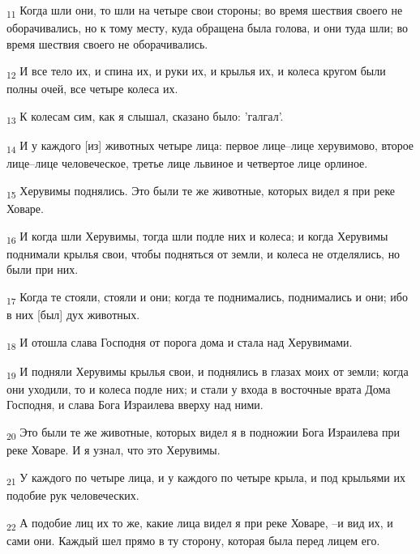 \begin{tcolorbox}
\textsubscript{11} Когда шли они, то шли на четыре свои стороны; во время шествия своего не оборачивались, но к тому месту, куда обращена была голова, и они туда шли; во время шествия своего не оборачивались.
\end{tcolorbox}
\begin{tcolorbox}
\textsubscript{12} И все тело их, и спина их, и руки их, и крылья их, и колеса кругом были полны очей, все четыре колеса их.
\end{tcolorbox}
\begin{tcolorbox}
\textsubscript{13} К колесам сим, как я слышал, сказано было: 'галгал'.
\end{tcolorbox}
\begin{tcolorbox}
\textsubscript{14} И у каждого [из] животных четыре лица: первое лице--лице херувимово, второе лице--лице человеческое, третье лице львиное и четвертое лице орлиное.
\end{tcolorbox}
\begin{tcolorbox}
\textsubscript{15} Херувимы поднялись. Это были те же животные, которых видел я при реке Ховаре.
\end{tcolorbox}
\begin{tcolorbox}
\textsubscript{16} И когда шли Херувимы, тогда шли подле них и колеса; и когда Херувимы поднимали крылья свои, чтобы подняться от земли, и колеса не отделялись, но были при них.
\end{tcolorbox}
\begin{tcolorbox}
\textsubscript{17} Когда те стояли, стояли и они; когда те поднимались, поднимались и они; ибо в них [был] дух животных.
\end{tcolorbox}
\begin{tcolorbox}
\textsubscript{18} И отошла слава Господня от порога дома и стала над Херувимами.
\end{tcolorbox}
\begin{tcolorbox}
\textsubscript{19} И подняли Херувимы крылья свои, и поднялись в глазах моих от земли; когда они уходили, то и колеса подле них; и стали у входа в восточные врата Дома Господня, и слава Бога Израилева вверху над ними.
\end{tcolorbox}
\begin{tcolorbox}
\textsubscript{20} Это были те же животные, которых видел я в подножии Бога Израилева при реке Ховаре. И я узнал, что это Херувимы.
\end{tcolorbox}
\begin{tcolorbox}
\textsubscript{21} У каждого по четыре лица, и у каждого по четыре крыла, и под крыльями их подобие рук человеческих.
\end{tcolorbox}
\begin{tcolorbox}
\textsubscript{22} А подобие лиц их то же, какие лица видел я при реке Ховаре, --и вид их, и сами они. Каждый шел прямо в ту сторону, которая была перед лицем его.
\end{tcolorbox}
